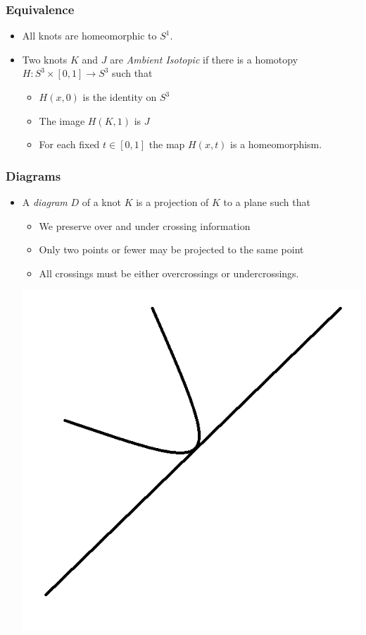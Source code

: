 \documentclass{beamer}
\begin{document}
\begin{frame}
  \frametitle{Equivalence}
  \begin{itemize}
  \item All knots are homeomorphic to $S^1$.
  \item Two knots $K$ and $J$ are \textit{Ambient Isotopic}
    if there is a homotopy $H:S^3\times[0,1]\rightarrow S^3$ such that
    \begin{itemize}
    \item $H(x,0)$ is the identity on $S^3$
    \item The image $H(K,1)$ is $J$
    \item For each fixed $t\in[0,1]$ the map $H(x,t)$ is a
      homeomorphism.
    \end{itemize}
  \end{itemize}
\end{frame}

\begin{frame}
  \frametitle{Diagrams}
  \begin{itemize}
  \item A \textit{diagram} $D$ of a knot $K$ is a projection of
    $K$ to a plane such that
    \begin{itemize}
    \item We preserve over and under crossing information
    \item Only two points or fewer may be projected to the same
      point
    \item All crossings must be either overcrossings or undercrossings.
      
    \end{itemize}
    \begin{center}
      \includegraphics[scale=.2]{bad-crossing}  
    \end{center}
  \end{itemize}
\end{frame}
\end{document}
